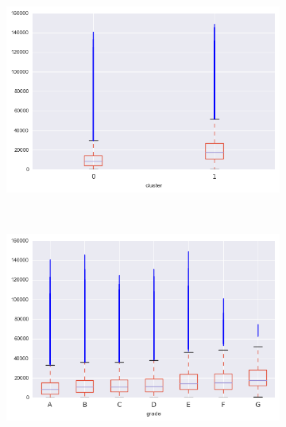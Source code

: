 \begin{anexosenv}
\begin{figure}[t!]
\begin{subfigure}[t]{0.5\textwidth}
            \centerline{\includegraphics[width=1\textwidth]{img/revol_bal_by_cluster}}
        \end{subfigure}%
        ~ 
        \begin{subfigure}[t]{0.5\textwidth}
            \centering
   
            \centerline{\includegraphics[width=1\textwidth]{img/revol_bal_by_grade}}

        \end{subfigure}
        \\
                \caption{total\textunderscore acc}
        \begin{subfigure}[t]{0.5\textwidth}
            \centering


\end{subfigure}
\end{figure}
\end{anexosenv}
